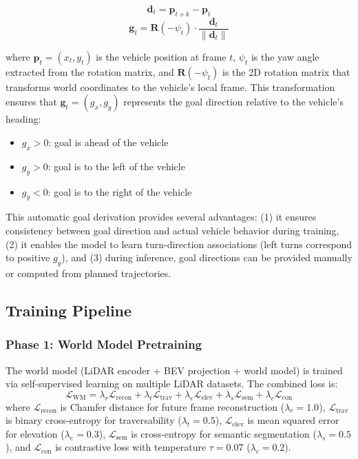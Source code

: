 \documentclass[journal]{IEEEtran}
\begin{document}
\begin{equation}
    \mathbf{d}_t = \mathbf{p}_{t+k} - \mathbf{p}_t
\end{equation}
\begin{equation}
    \mathbf{g}_t = \mathbf{R}(-\psi_t) \cdot \frac{\mathbf{d}_t}{\|\mathbf{d}_t\|}
\end{equation}

where $\mathbf{p}_t = (x_t, y_t)$ is the vehicle position at frame $t$, $\psi_t$ is the yaw angle extracted from the rotation matrix, and $\mathbf{R}(-\psi_t)$ is the 2D rotation matrix that transforms world coordinates to the vehicle's local frame. This transformation ensures that $\mathbf{g}_t = (g_x, g_y)$ represents the goal direction relative to the vehicle's heading:
\begin{itemize}
    \item $g_x > 0$: goal is ahead of the vehicle
    \item $g_y > 0$: goal is to the left of the vehicle
    \item $g_y < 0$: goal is to the right of the vehicle
\end{itemize}

This automatic goal derivation provides several advantages: (1) it ensures consistency between goal direction and actual vehicle behavior during training, (2) it enables the model to learn turn-direction associations (left turns correspond to positive $g_y$), and (3) during inference, goal directions can be provided manually or computed from planned trajectories.

\subsection{Training Pipeline}
\label{sec:training}

\subsubsection{Phase 1: World Model Pretraining}
The world model (LiDAR encoder + BEV projection + world model) is trained via self-supervised learning on multiple LiDAR datasets. The combined loss is:
\begin{equation}
    \mathcal{L}_\text{WM} = \lambda_r \mathcal{L}_\text{recon} + \lambda_t \mathcal{L}_\text{trav} + \lambda_e \mathcal{L}_\text{elev} + \lambda_s \mathcal{L}_\text{sem} + \lambda_c \mathcal{L}_\text{con}
\end{equation}
where $\mathcal{L}_\text{recon}$ is Chamfer distance for future frame reconstruction ($\lambda_r = 1.0$), $\mathcal{L}_\text{trav}$ is binary cross-entropy for traversability ($\lambda_t = 0.5$), $\mathcal{L}_\text{elev}$ is mean squared error for elevation ($\lambda_e = 0.3$), $\mathcal{L}_\text{sem}$ is cross-entropy for semantic segmentation ($\lambda_s = 0.5$), and $\mathcal{L}_\text{con}$ is contrastive loss with temperature $\tau = 0.07$ ($\lambda_c = 0.2$).
\end{document}
